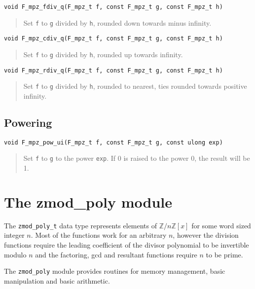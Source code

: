 \documentclass[a4paper,10pt]{article}
\newcommand{\Z}{\mathbb{Z}}
\newcommand{\code}{\lstinline}
\begin{document}
\begin{lstlisting}
void F_mpz_fdiv_q(F_mpz_t f, const F_mpz_t g, const F_mpz_t h)
\end{lstlisting}
\begin{quote}
Set \code{f} to \code{g} divided by \code{h}, rounded down towards minus infinity.
\end{quote}

\begin{lstlisting}
void F_mpz_cdiv_q(F_mpz_t f, const F_mpz_t g, const F_mpz_t h)
\end{lstlisting}
\begin{quote}
Set \code{f} to \code{g} divided by \code{h}, rounded up towards infinity.
\end{quote}

\begin{lstlisting}
void F_mpz_rdiv_q(F_mpz_t f, const F_mpz_t g, const F_mpz_t h)
\end{lstlisting}
\begin{quote}
Set \code{f} to \code{g} divided by \code{h}, rounded to nearest, ties rounded towards positive infinity.
\end{quote}

\subsection{Powering}

\begin{lstlisting}
void F_mpz_pow_ui(F_mpz_t f, const F_mpz_t g, const ulong exp)
\end{lstlisting}
\begin{quote}
Set \code{f} to \code{g} to the power \code{exp}. If 0 is raised to the power 0, the result will be 1.
\end{quote}

\section{The zmod\_poly module}

The \code{zmod_poly_t} data type represents elements of $\Z/n\Z[x]$ for some word sized integer $n$. Most of the functions work for an arbitrary $n$, however the division functions require the leading coefficient of the divisor polynomial to be invertible modulo $n$ and the factoring, gcd and resultant functions require $n$ to be prime.

The \code{zmod_poly} module provides routines for memory management, basic manipulation and basic arithmetic.
\end{document}
